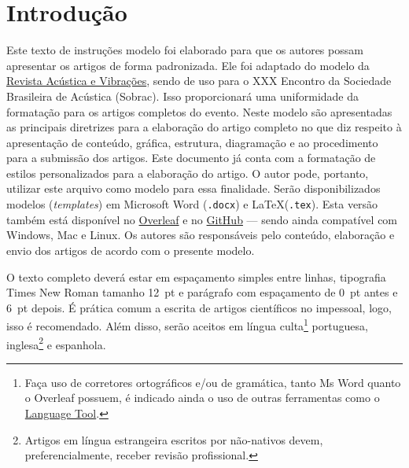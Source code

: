 \clearpage %

\section{Introdução}

Este texto de instruções modelo foi elaborado para que os autores possam apresentar os artigos de forma padronizada. 
Ele foi adaptado do modelo da \href{https://revista.acustica.org.br}{Revista Acústica e Vibrações}, sendo de uso para o XXX Encontro da Sociedade Brasileira de Acústica (Sobrac).
%
Isso proporcionará uma uniformidade da formatação para os artigos completos do evento.
Neste modelo são apresentadas as principais diretrizes para a elaboração do artigo completo no que diz respeito à apresentação de conteúdo, gráfica, estrutura, diagramação e ao procedimento para a submissão dos artigos. 
Este documento já conta com a formatação de estilos personalizados para a elaboração do artigo. O autor pode, portanto, utilizar este arquivo como modelo para essa finalidade. Serão disponibilizados modelos (\textit{templates}) em Microsoft Word (\texttt{.docx}) e \LaTeX\xspace (\texttt{.tex}). Esta versão também está disponível no \href{https://www.overleaf.com/read/xnhkrtjwprcn}{Overleaf} e no \href{https://github.com/willdfonseca/latex}{GitHub} --- sendo ainda compatível com Windows, Mac e Linux. 
Os autores são responsáveis pelo conteúdo, elaboração e envio dos artigos de acordo com o presente modelo.

O texto completo deverá estar em espaçamento simples entre linhas, tipografia Times New Roman tamanho 12~pt e parágrafo com espaçamento de 0~pt antes e 6~pt depois. É prática comum a escrita de artigos científicos no impessoal, logo,  isso é recomendado. Além disso, serão aceitos em língua culta\footnote{Faça uso de corretores ortográficos e/ou de gramática, tanto Ms Word quanto o Overleaf possuem, é indicado ainda o uso de outras ferramentas como o \href{https://languagetool.org/pt-BR}{Language Tool}.} portuguesa, inglesa\footnote{Artigos em língua estrangeira escritos por não-nativos devem, preferencialmente, receber revisão profissional.} e espanhola\footnotemark[2]. 


